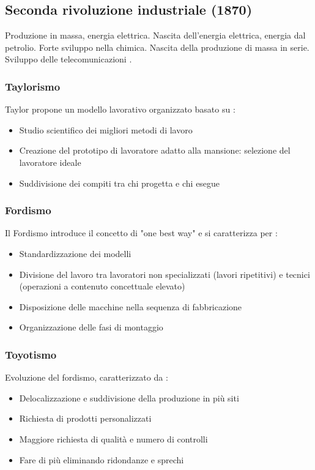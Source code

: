 \documentclass[12pt,a4paper]{article}
\begin{document}
\subsection{Seconda rivoluzione industriale (1870)}
Produzione in massa, energia elettrica. Nascita dell'energia elettrica, energia dal petrolio. Forte sviluppo nella chimica. Nascita della produzione di massa in serie. Sviluppo delle telecomunicazioni .

\subsubsection{Taylorismo}
Taylor propone un modello lavorativo organizzato basato su :
\begin{itemize}
    \item Studio scientifico dei migliori metodi di lavoro
    \item Creazione del prototipo di lavoratore adatto alla mansione: selezione del lavoratore ideale
    \item Suddivisione dei compiti tra chi progetta e chi esegue
\end{itemize}

\subsubsection{Fordismo}
Il Fordismo introduce il concetto di "one best way" e si caratterizza per :
\begin{itemize}
    \item Standardizzazione dei modelli
    \item Divisione del lavoro tra lavoratori non specializzati (lavori ripetitivi) e tecnici (operazioni a contenuto concettuale elevato)
    \item Disposizione delle macchine nella sequenza di fabbricazione
    \item Organizzazione delle fasi di montaggio
\end{itemize}

\subsubsection{Toyotismo}
Evoluzione del fordismo, caratterizzato da :
\begin{itemize}
    \item Delocalizzazione e suddivisione della produzione in più siti
    \item Richiesta di prodotti personalizzati
    \item Maggiore richiesta di qualità e numero di controlli
    \item Fare di più eliminando ridondanze e sprechi
\end{itemize}
\end{document}
